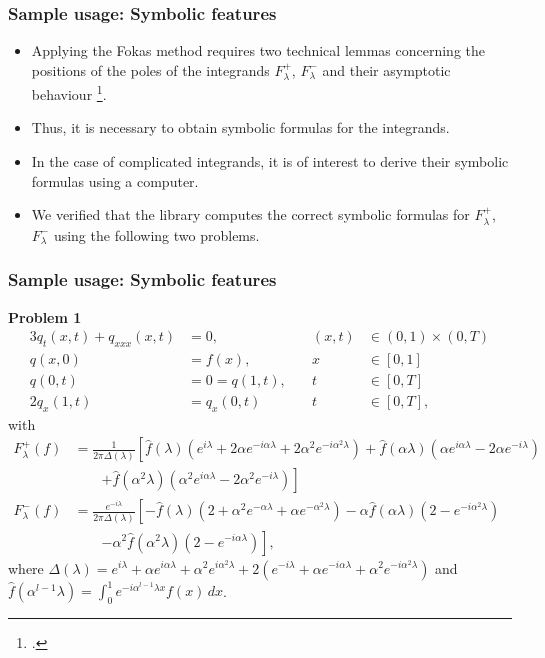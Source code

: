 \documentclass{beamer}
\begin{document}
\begin{frame}
    \frametitle{Sample usage: Symbolic features}
    \begin{itemize}\setlength\itemsep{1em}
        \item Applying the Fokas method requires two technical lemmas concerning the positions of the poles of the integrands $F_\lambda^+$, $F_\lambda^-$ and their asymptotic behaviour \footcite{Miller2018}. 
        \item Thus, it is necessary to obtain symbolic formulas for the integrands. 
        \item In the case of complicated integrands, it is of interest to derive their symbolic formulas using a computer.
        \item We verified that the library computes the correct symbolic formulas for $F_\lambda^+$, $F_\lambda^-$ using the following two problems.
    \end{itemize}
\end{frame}

\begin{frame}
    \frametitle{Sample usage: Symbolic features}
    \textbf{Problem 1}
    \small
    \begin{alignat*}{3}
        q_t(x,t) + q_{xxx}(x,t) &= 0,\quad &(x,t)&\in (0,1)\times (0,T)\\
        q(x,0) &= f(x),\quad &x&\in [0,1]\\
        q(0,t) &= 0 = q(1,t), \quad &t&\in [0,T]\\
        2q_x(1,t) &= q_x(0,t)\quad &t&\in [0,T],
        \end{alignat*}
        with
        \begin{align*}
        F_\lambda^+(f) &= \frac{1}{2\pi\Delta(\lambda)}\left[\hat{f}(\lambda)(e^{i\lambda} + 2\alpha e^{-i\alpha\lambda} + 2\alpha^2 e^{-i\alpha^2\lambda}) + \hat{f}(\alpha\lambda)(\alpha e^{i\alpha\lambda} - 2\alpha e^{-i\lambda}) \right.\\
        &\qquad \left. + \hat{f}(\alpha^2\lambda)(\alpha^2e^{i\alpha\lambda} - 2\alpha^2e^{-i\lambda})\right]\\
        F_\lambda^-(f) &= \frac{e^{-i\lambda}}{2\pi\Delta(\lambda)}\left[-\hat{f}(\lambda)(2+\alpha^2 e^{-\alpha\lambda} + \alpha e^{-\alpha^2\lambda}) - \alpha\hat{f}(\alpha\lambda)(2-e^{-i\alpha^2\lambda}) \right.\\ 
        &\qquad \left. - \alpha^2\hat{f}(\alpha^2\lambda)(2-e^{-i\alpha\lambda})\right],
        \end{align*}
        where $\Delta(\lambda) = e^{i\lambda} + \alpha e^{i\alpha\lambda} + \alpha^2 e^{i\alpha^2\lambda} + 2(e^{-i\lambda} + \alpha e^{-i\alpha\lambda} + \alpha^2e^{-i\alpha^2\lambda})$ and $\hat{f}(\alpha^{l-1}\lambda) = \int_0^1 e^{-i\alpha^{l-1}\lambda x}f(x)\,dx$.
\end{frame}
\end{document}
